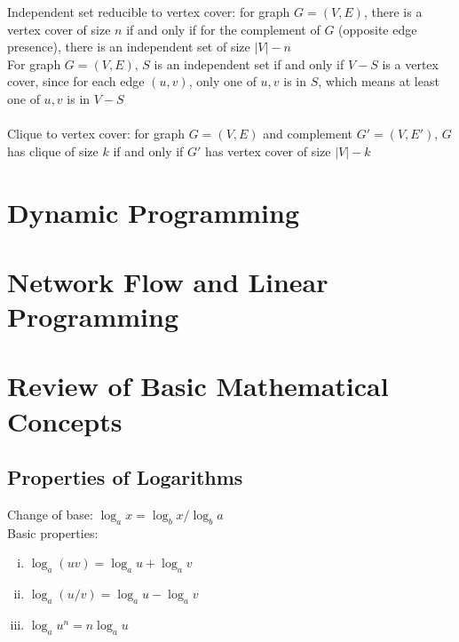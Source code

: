 \documentclass{article}
\begin{document}
			Independent set reducible to vertex cover: for graph $G = (V, E)$, there is a vertex cover of size $n$ if and only if for the complement of $G$ (opposite edge presence), there is an independent set of size $|V| - n$ \\
			For graph $G = (V, E)$, $S$ is an independent set if and only if $V - S$ is a vertex cover, since for each edge $(u, v)$, only one of $u, v$ is in $S$, which means at least one of $u, v$ is in $V - S$ \\
			\\
			Clique to vertex cover: for graph $G = (V, E)$ and complement $G' = (V, E')$, $G$ has clique of size $k$ if and only if $G'$ has vertex cover of size $|V| - k$ \\


	\section{Dynamic Programming}
		\clearpage

	\section{Network Flow and Linear Programming}
		\clearpage


	\appendix

	\section{Review of Basic Mathematical Concepts}
		\subsection{Properties of Logarithms}
			Change of base: $\log_a x = \log_b x/\log_b a$ \\
			Basic properties:
			\begin{enumerate}[(i)]
				\item $\log_a(uv) = \log_a u + \log_a v$
				\item $\log_a(u / v) = \log_a u - \log_a v$
				\item $\log_a u^n = n \log_a u$
				\end{enumerate}



	
\end{document}
